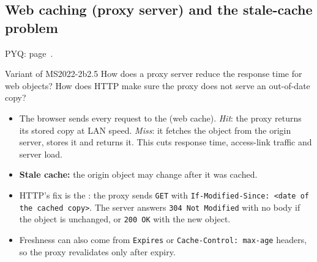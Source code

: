 \subsection{Web caching (proxy server) and the stale-cache problem}\label{iq:C14}
     \quad PYQ: page~\pageref{q:MS2022-2b}.
\begin{question}{Variant of MS2022-2b}{2.5}
How does a proxy server reduce the response time for web objects? How does HTTP make sure the proxy does not serve an out-of-date copy?
\end{question}
\begin{solution}[outline]
\begin{itemize}
\item The browser sends every request to the  (web cache). \emph{Hit}: the proxy returns its stored copy at LAN speed. \emph{Miss}: it fetches the object from the origin server, stores it and returns it. This cuts response time, access-link traffic and server load.
\item \textbf{Stale cache:} the origin object may change after it was cached.
\item HTTP's fix is the : the proxy sends \texttt{GET} with \texttt{If-Modified-Since: <date of the cached copy>}. The server answers \texttt{304 Not Modified} with no body if the object is unchanged, or \texttt{200 OK} with the new object.
\item Freshness can also come from \texttt{Expires} or \texttt{Cache-Control: max-age} headers, so the proxy revalidates only after expiry.
\end{itemize}
\end{solution}

